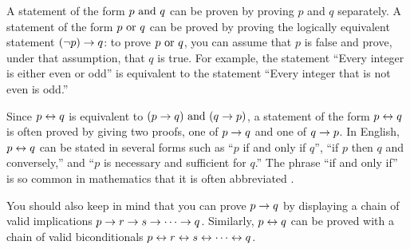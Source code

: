 A statement of the form $p\text{ and } q$ can be proven by proving
$p$ and $q$ separately.  A statement of the form $p\text{ or } q$
can be proved by proving the logically equivalent statement
$(\lnot p)\rightarrow q$: to prove
$p\text{ or } q$, you can assume that $p$ is false and prove, under
that assumption, that $q$ is true.  For example, the
statement ``Every integer is either even or odd'' is
equivalent to the statement ``Every integer that is not even
is odd.''

Since $p\leftrightarrow q$ is equivalent
to $(p\rightarrow q)\text{ and }(q\rightarrow p)$, a statement of the form $p\leftrightarrow q$
is often proved by giving two proofs, one of
$p\rightarrow q$ and one of $q\rightarrow p$.  In English,
$p\leftrightarrow q$ can be stated in several forms such as
``$p$ if and only if $q$'', ``if $p$ then $q$ and conversely,''
and ``$p$ is necessary and sufficient for $q$.''  The phrase
``if and only if'' is so common in mathematics that it is
often abbreviated .

You should also keep in mind that you can prove $p\rightarrow q$
by displaying a chain of valid implications $p\rightarrow r\rightarrow s\rightarrow \cdots\rightarrow q$.
Similarly, $p\leftrightarrow q$ can be proved with a chain of valid
biconditionals $p\leftrightarrow r\leftrightarrow s\leftrightarrow \cdots\leftrightarrow q$.

\medbreak

